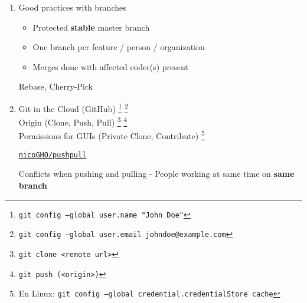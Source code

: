 \documentclass[12pt,a4paper]{article}
\begin{document}
\begin{enumerate}
		
		
		\newpage
		\item Good practices with branches
		\begin{itemize}
			\item Protected \textbf{stable} master branch
			
			\item One branch per feature / person / organization
			
			\item Merges done with affected coder(s) present
		\end{itemize}
		
		
		\vspace{10cm}
		Rebase, Cherry-Pick

		
		\newpage
		\item Git in the Cloud (GitHub) \footnote{\texttt{git config --global user.name "John Doe"}} \footnote{\texttt{git config --global user.email johndoe@example.com}} \\ Origin (Clone, Push, Pull) \footnote{\texttt{git clone <remote url>}} \footnote{\texttt{git push (<origin>)}} \\ Permissions for GUIs (Private Clone, Contribute) \footnote{En Linux: \texttt{git config --global credential.credentialStore cache}}
		
		
		\vspace{1cm}
		\href{https://github.com/nicoGHO/pushpull}{\texttt{nicoGHO/pushpull}}
		
		\vspace{7cm}
		Conflicts when pushing and pulling - People working at same time on \textbf{same branch}
		
		\vspace{3cm}
		
\end{enumerate}
\end{document}
